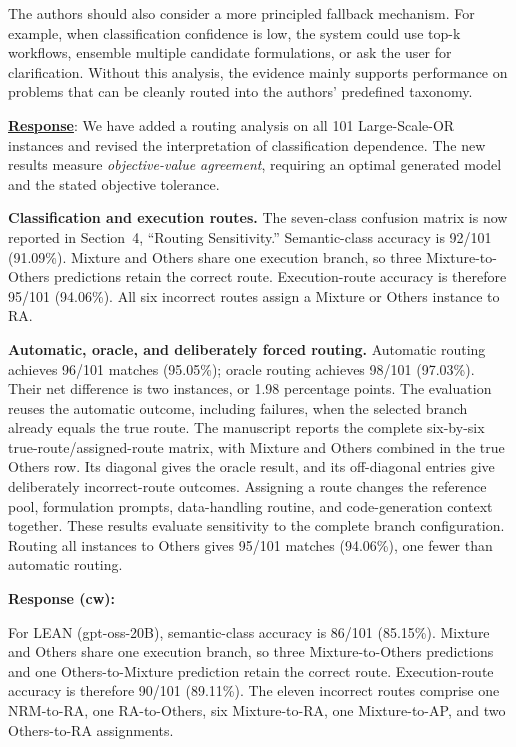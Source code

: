 \documentclass[11pt]{article}
\begin{document}
\begin{enumerate}[label=(AssoE.\arabic*),leftmargin=*]
\begin{enumerate}[label=(R1.Major.\arabic*),leftmargin=*]
{The authors should also consider a more principled fallback mechanism. For example, when classification confidence is low, the system could use top-k workflows, ensemble multiple candidate formulations, or ask the user for clarification. Without this analysis, the evidence mainly supports performance on problems that can be cleanly routed into the authors' predefined taxonomy.}\label{R1-major-3}

\noindent\underline{\textbf{Response}}:
We have added a routing analysis on all 101 Large-Scale-OR instances and revised the interpretation of classification dependence. The new results measure \emph{objective-value agreement}, requiring an optimal generated model and the stated objective tolerance. 

\textbf{Classification and execution routes.}
The seven-class confusion matrix is now reported in Section~4, ``Routing Sensitivity.'' Semantic-class accuracy is 92/101 (91.09\%). Mixture and Others share one execution branch, so three Mixture-to-Others predictions retain the correct route. Execution-route accuracy is therefore 95/101 (94.06\%). All six incorrect routes assign a Mixture or Others instance to RA.

\textbf{Automatic, oracle, and deliberately forced routing.}
Automatic routing achieves 96/101 matches (95.05\%); oracle routing achieves 98/101 (97.03\%). Their net difference is two instances, or 1.98 percentage points. The evaluation reuses the automatic outcome, including failures, when the selected branch already equals the true route. The manuscript reports the complete six-by-six true-route/assigned-route matrix, with Mixture and Others combined in the true Others row. Its diagonal gives the oracle result, and its off-diagonal entries give deliberately incorrect-route outcomes. Assigning a route changes the reference pool, formulation prompts, data-handling routine, and code-generation context together. These results evaluate sensitivity to the complete branch configuration. Routing all instances to Others gives 95/101 matches (94.06\%), one fewer than automatic routing.

\textbf{Response (cw):}

For LEAN (gpt-oss-20B), semantic-class accuracy is 86/101
(85.15\%). Mixture and Others share one execution branch, so three Mixture-to-Others predictions and one Others-to-Mixture prediction retain the correct route. Execution-route accuracy is therefore 90/101 (89.11\%). The eleven incorrect routes comprise one NRM-to-RA, one RA-to-Others, six Mixture-to-RA, one Mixture-to-AP, and two Others-to-RA assignments.


\end{enumerate}
\end{enumerate}
\end{document}
